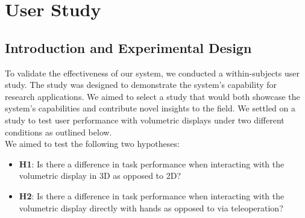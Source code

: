 \section{User Study}
\subsection{Introduction and Experimental Design}
To validate the effectiveness of our system, we conducted a within-subjects user study. The study was designed to demonstrate the system's capability for research applications. We aimed to select a study that would both showcase the system's capabilities and contribute novel insights to the field. We settled on a study to test user performance with volumetric displays under two different conditions as outlined below. \\

We aimed to test the following two hypotheses:
\begin{itemize}[itemsep=-0.3em]
    \item \textbf{H1}: Is there a difference in task performance when interacting with the volumetric display in 3D as opposed to 2D?
    \item \textbf{H2}: Is there a difference in task performance when interacting with the volumetric display directly with hands as opposed to via teleoperation?
\end{itemize}

